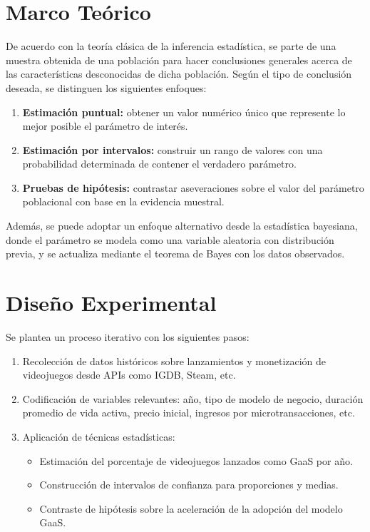\documentclass[12pt]{article}
\begin{document}
\section{Marco Teórico}
De acuerdo con la teoría clásica de la inferencia estadística, se parte de una muestra obtenida de una población para hacer conclusiones generales acerca de las características desconocidas de dicha población. Según el tipo de conclusión deseada, se distinguen los siguientes enfoques:

\begin{enumerate}
    \item \textbf{Estimación puntual:} obtener un valor numérico único que represente lo mejor posible el parámetro de interés.
    \item \textbf{Estimación por intervalos:} construir un rango de valores con una probabilidad determinada de contener el verdadero parámetro.
    \item \textbf{Pruebas de hipótesis:} contrastar aseveraciones sobre el valor del parámetro poblacional con base en la evidencia muestral.
\end{enumerate}

Además, se puede adoptar un enfoque alternativo desde la estadística bayesiana, donde el parámetro se modela como una variable aleatoria con distribución previa, y se actualiza mediante el teorema de Bayes con los datos observados.

\section{Diseño Experimental}
Se plantea un proceso iterativo con los siguientes pasos:
\begin{enumerate}
    \item Recolección de datos históricos sobre lanzamientos y monetización de videojuegos desde APIs como IGDB, Steam, etc.
    \item Codificación de variables relevantes: año, tipo de modelo de negocio, duración promedio de vida activa, precio inicial, ingresos por microtransacciones, etc.
    \item Aplicación de técnicas estadísticas:
    \begin{itemize}
        \item Estimación del porcentaje de videojuegos lanzados como GaaS por año.
        \item Construcción de intervalos de confianza para proporciones y medias.
        \item Contraste de hipótesis sobre la aceleración de la adopción del modelo GaaS.
    \end{itemize}
\end{enumerate}
\end{document}
